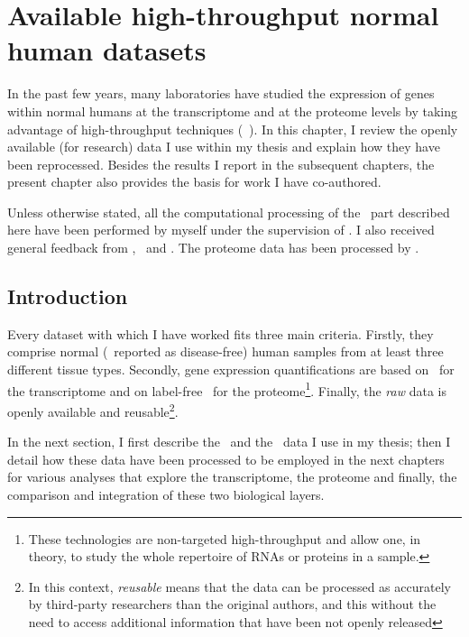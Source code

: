 \chapter{Available high-throughput normal human datasets}\label{ch:datasets}

\setlength{\epigraphwidth}{0.57\textwidth}%
\setlength{\epigraphrule}{0pt}%


In the past few years, many laboratories have studied the expression
of genes within normal humans at the transcriptome and at
the proteome levels by taking advantage of high-throughput techniques
(\eg\ \citet{Krupp2012,VTpaper,ramskoldan:2009,Uhlen2014,%
Uhlen2015,UhlenGastro,GTExTranscript,PeptideAtlas,PandeyData,KusterData}).
In this chapter, I review the openly available (for research) data
I use within my thesis
and explain how they have been reprocessed.
Besides the results I report in the subsequent chapters,
the present chapter also provides the basis for work
I have co-authored.\mybr\

Unless otherwise stated, all the computational processing of the \Rnaseq\ part
described here have been performed by myself under the supervision of
\alvis. I also received general feedback from \mar,
\johan\ and \nuno. The proteome data has been processed by \james.\mybr\


\section{Introduction}

Every dataset with which I have worked fits three main criteria.
Firstly, they comprise normal (\ie\ reported as disease-free) human samples
from at least three different tissue types.
Secondly, gene expression
quantifications are based on \Rnaseq\ for the transcriptome and on label-free \ms\
for the proteome\footnote{These
technologies are non-targeted high-throughput and
allow one, in theory, to study the whole
repertoire of \glspl{RNA} or proteins in a sample.}.
Finally, the \emph{raw} data is openly available and reusable\footnote{%
In this context, \emph{reusable} means that the data can be processed
as accurately by third-party researchers than the original authors,
and this without the need to access additional information
that have been not openly released}.\mybr\


In the next section, I first describe the \Rnaseq\ and the \ms\ data I use
in my thesis; then I detail how these data have been processed to be
employed in the next chapters for various analyses that explore the transcriptome,
the proteome and finally, the comparison and integration of these two
biological layers.\mybr\


